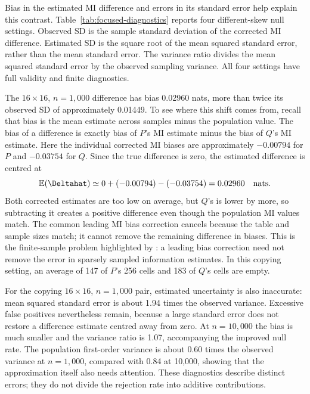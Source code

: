 Bias in the estimated MI difference and errors in its standard error help
explain this contrast.
Table~\ref{tab:focused-diagnostics} reports four
different-skew null settings. Observed SD is the sample standard deviation
of the corrected MI difference. Estimated SD is the square root of the
mean squared standard error, rather than the mean standard error. The
variance ratio divides the mean squared standard error by the observed
sampling variance. All four settings have full validity and finite diagnostics.

\begin{table}[htbp]
\centering
\small
\caption{Bias and uncertainty of the estimated MI difference.}
\label{tab:focused-diagnostics}

\end{table}

The \(16\times16\), \(n=1{,}000\) difference has bias 0.02960 nats,
more than twice its observed SD of approximately 0.01449. To see where
this shift comes from, recall that bias is the mean estimate across
samples minus the population value. The bias of a difference is exactly
bias of \(P\)'s MI estimate minus the bias of \(Q\)'s MI estimate. Here the
individual corrected MI biases are approximately \(-0.00794\) for \(P\)
and \(-0.03754\) for \(Q\). Since the true difference is zero, the
estimated difference is centred at
\begin{equation}
 \mathbb{E}(\Deltahat)
 \simeq 0+(-0.00794)-(-0.03754)=0.02960
 \quad\text{nats}.
 \label{eq:focused-null-bias-shift}
\end{equation}
Both corrected estimates are too low on average, but \(Q\)'s is lower
by more, so subtracting it creates a positive difference even
though the population MI values match. The common leading MI bias correction
cancels because the table and sample sizes match; it cannot remove the
remaining difference in biases. This is the finite-sample problem
highlighted by \citet{paninski2003}: a leading bias correction need not
remove the error in sparsely sampled information estimates. In this
copying setting, an average of 147 of \(P\)'s 256 cells and 183 of
\(Q\)'s cells are empty.

For the copying \(16\times16\), \(n=1{,}000\) pair, estimated uncertainty
is also inaccurate: mean squared standard error is about 1.94 times the
observed variance. Excessive false
positives nevertheless remain, because a large standard error does not
restore a difference estimate centred away from zero. At \(n=10{,}000\)
the bias is much smaller and the variance ratio is 1.07, accompanying
the improved null rate. The population first-order variance is about
0.60 times the observed variance at \(n=1{,}000\), compared with 0.84
at 10,000, showing that the approximation itself also needs attention.
These diagnostics describe distinct errors; they do not divide the
rejection rate into additive contributions.

